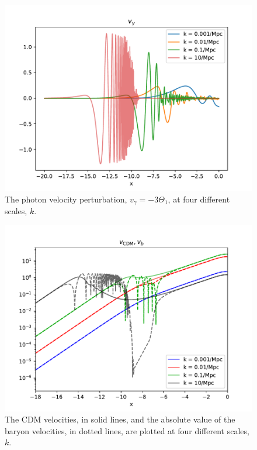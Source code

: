 \documentclass{aa}
\begin{document}
\begin{figure}[H]
   \includegraphics[scale=0.6]{../figures/milestone3/v_gamma.pdf}
   \caption{The photon velocity perturbation, $v_\gamma=-3\Theta_1$, at four different scales, $k$.}\label{fig:v_gamma}
\end{figure}

\begin{figure}[H]
   \includegraphics[scale=0.6]{../figures/milestone3/v_cdm_v_b.pdf}
   \caption{The CDM velocities, in solid lines, and the absolute value of the baryon velocities,
   in dotted lines, are plotted at four different scales, $k$.}\label{fig:v_cdm_v_b}
\end{figure}
\end{document}
